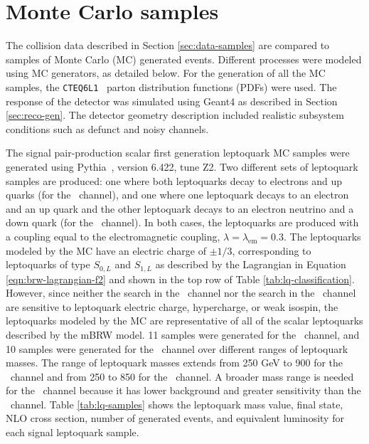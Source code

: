 \section{Monte Carlo samples}
\label{sec:mc-samples}

The collision data described in Section \ref{sec:data-samples}
are compared to samples of Monte Carlo (MC) generated events.
Different processes were modeled using MC generators, as detailed below.
For the generation of all the MC samples, the {\tt CTEQ6L1}~\cite{cteq}
parton distribution functions (PDFs) were used.
The response of the detector was simulated using
{\sc Geant4} as described in Section \ref{sec:reco-gen}. 
The detector geometry description included
realistic subsystem conditions such as defunct and noisy channels.

The signal pair-production scalar first generation leptoquark MC samples were generated using 
{\sc Pythia}~\cite{pythia}, version 6.422, tune Z2.
Two different sets of leptoquark samples are produced: 
one where both leptoquarks decay to electrons and up quarks (for the \eejj~channel), and 
one where one leptoquark decays to an electron and an up quark and the
other leptoquark decays to an electron neutrino and a down quark (for the \enujj~channel).
In both cases, the leptoquarks are produced with a coupling equal to the
electromagnetic coupling, $\lambda = \lambda_{\text{em}} = 0.3$.
The leptoquarks modeled by the MC have an electric charge of $\pm 1/3$, corresponding to leptoquarks
of type $S_{0,L}$ and $S_{1,L}$ as described by the Lagrangian in 
Equation \ref{eqn:brw-lagrangian-f2} and shown in the
top row of Table \ref{tab:lq-classification}.
However, since neither the search in the \eejj~channel nor the search in the \enujj~channel
are sensitive to leptoquark electric charge, hypercharge,
or weak isospin, the leptoquarks modeled by the MC are
representative of all of the scalar leptoquarks described
by the mBRW model.
11 samples were generated for the \eejj~channel, and 10 samples were generated for the \enujj~channel
over different ranges of leptoquark masses.
The range of leptoquark masses extends from 250 GeV to 900 for the \eejj~channel and
from 250 to 850 for the \enujj~channel.  A broader mass range is needed for the \eejj~channel
because it has lower background and greater sensitivity than the \enujj~channel.
Table \ref{tab:lq-samples} shows the leptoquark mass value,
final state, NLO cross section, number of generated events, and equivalent luminosity
for each signal leptoquark sample.

